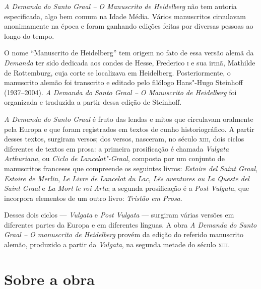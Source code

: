 \noindent\emph{A Demanda do Santo Graal -- O Manuscrito de Heidelberg} não tem
autoria especificada, algo bem comum na Idade Média. Vários manuscritos
circulavam anonimamente na época e foram ganhando edições feitas por
diversas pessoas ao longo do tempo.

O nome ``Manuscrito de Heidelberg'' tem origem no fato de essa versão
alemã da \emph{Demanda} ter sido dedicada aos condes de Hesse, Frederico
\textsc{i} e sua irmã, Mathilde de Rottemburg, cuja corte se localizava em
Heidelberg.
Posteriormente, o manuscrito alemão foi transcrito e editado pelo
filólogo Hans"-Hugo Steinhoff (1937--2004).
\emph{A Demanda do Santo Graal -- O Manuscrito de Heidelberg} foi organizada e
traduzida a partir dessa edição de Steinhoff.



\emph{A Demanda do Santo Graal} é fruto das lendas e mitos
que circulavam oralmente pela Europa e que foram registrados em textos
de cunho historiográfico. A partir desses textos, surgiram versos; dos
versos, nasceram, no século \textsc{xiii}, dois ciclos diferentes de textos em
prosa: a primeira prosificação é chamada \emph{Vulgata Arthuriana}, ou
\emph{Ciclo de Lancelot"-Graal}, composta por um conjunto de manuscritos franceses que compreende os seguintes livros: \emph{Estoire del Saint Graal}, \emph{Estoire
de Merlin}, \emph{Le Livre de Lancelot du Lac}, \emph{Lês aventures ou La Queste del
Saint Graal} e \emph{La Mort le roi Artu}; a segunda prosificação é a
\emph{Post Vulgata}, que incorpora elementos de um outro livro:
\emph{Tristão em Prosa}.

Desses dois ciclos --- \emph{Vulgata} e \emph{Post
Vulgata} --- surgiram várias versões em diferentes partes da Europa e em
diferentes línguas. A obra \emph{A Demanda do Santo Graal -- O
manuscrito de Heidelberg} provém da edição do referido manuscrito
alemão, produzido a partir da \emph{Vulgata}, na segunda metade do
século \textsc{xiii}.

\section{Sobre a obra}

